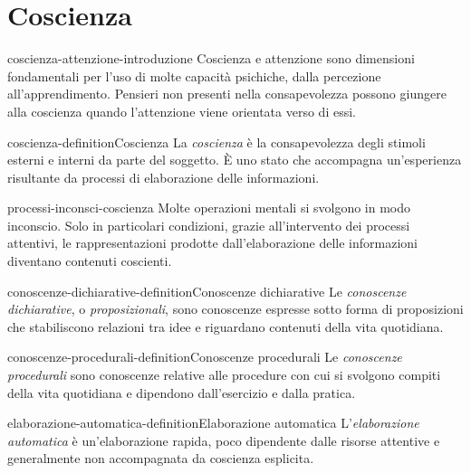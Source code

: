 \documentclass[preview]{standalone}
\begin{document}
\genpage

\section{Coscienza}

\begin{snippet}{coscienza-attenzione-introduzione}
    Coscienza e attenzione sono dimensioni fondamentali per l'uso di molte
    capacità psichiche, dalla percezione all'apprendimento. Pensieri non
    presenti nella consapevolezza possono giungere alla coscienza quando
    l'attenzione viene orientata verso di essi.
\end{snippet}

\begin{snippetdefinition}{coscienza-definition}{Coscienza}
    La \emph{coscienza} è la consapevolezza degli stimoli esterni e interni da
    parte del soggetto. È uno stato che accompagna un'esperienza risultante da
    processi di elaborazione delle informazioni.
\end{snippetdefinition}

\begin{snippet}{processi-inconsci-coscienza}
    Molte operazioni mentali si svolgono in modo inconscio. Solo in particolari
    condizioni, grazie all'intervento dei processi attentivi, le rappresentazioni
    prodotte dall'elaborazione delle informazioni diventano contenuti coscienti.
\end{snippet}

\begin{snippetdefinition}{conoscenze-dichiarative-definition}{Conoscenze dichiarative}
    Le \emph{conoscenze dichiarative}, o \emph{proposizionali}, sono conoscenze
    espresse sotto forma di proposizioni che stabiliscono relazioni tra idee e
    riguardano contenuti della vita quotidiana.
\end{snippetdefinition}

\begin{snippetdefinition}{conoscenze-procedurali-definition}{Conoscenze procedurali}
    Le \emph{conoscenze procedurali} sono conoscenze relative alle procedure con
    cui si svolgono compiti della vita quotidiana e dipendono dall'esercizio e
    dalla pratica.
\end{snippetdefinition}

\begin{snippetdefinition}{elaborazione-automatica-definition}{Elaborazione automatica}
    L'\emph{elaborazione automatica} è un'elaborazione rapida, poco dipendente
    dalle risorse attentive e generalmente non accompagnata da coscienza
    esplicita.
\end{snippetdefinition}
\end{document}

